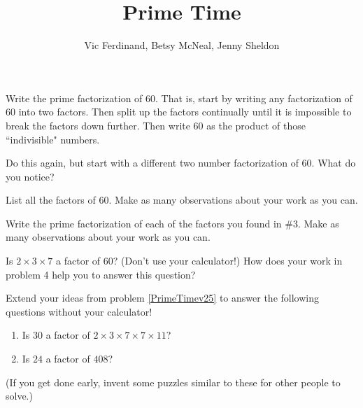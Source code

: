 \documentclass[noauthor, nooutcomes]{ximera}
\title{Prime Time}
\author{Vic Ferdinand, Betsy McNeal, Jenny Sheldon}
\begin{document}
\begin{abstract} \end{abstract}
\maketitle



\begin{problem}
 Write the prime factorization of 60.  That is, start by writing any factorization of 60 into two factors.  Then split up the factors continually until it is impossible to break the factors down further.  Then write 60 as the product of those ``indivisible" numbers.
\end{problem} 
\begin{problem}
 Do this again, but start with a different two number factorization of 60.  What do you notice?
\end{problem} 
\begin{problem}
 List all the factors of 60.  Make as many observations about your work as you can.
\end{problem} 
\begin{problem}\label{PrimeTime4}
 Write the prime factorization of each of the factors you found in $\#$3.  Make as many observations about your work as you can.  %
\end{problem} 

\begin{problem}\label{PrimeTimev25}
Is $2 \times 3 \times 7$ a factor of $60$? (Don't use your calculator!) How does your work in problem 4 help you to answer this question?
\end{problem}


\begin{problem}
Extend your ideas from problem \ref{PrimeTimev25} to answer the following questions without your calculator!
\begin{enumerate}
    \item Is $30$ a factor of $2 \times 3 \times 7 \times 7 \times 11$?
    \item Is $24$ a factor of $408$?
\end{enumerate}

(If you get done early, invent some puzzles similar to these for other people to solve.)
\end{problem}
\end{document}

